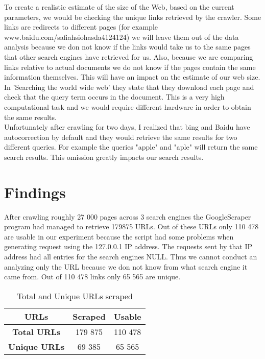 \documentclass{sig-alternate}
\begin{document}
To create a realistic estimate of the size of the Web, based on the current parameters, we would be checking the unique links retrieved by the crawler. Some links are redirects to different pages (for example www.baidu.com/safiahsiohasda4124124) we will leave them out of the data analysis because we don not know if the links would take us to the same pages that other search engines have retrieved for us. Also, because we are comparing links relative to actual documents we do not know if the pages contain the same information themselves. This will have an impact on the estimate of our web size. In 'Searching the world wide web' they state that they download each page and check that the query term occurs in the document. This is a very high computational task and we would require different hardware in order to obtain the same results.\\

Unfortunately after crawling for two days, I realized that bing and Baidu have autocorrection by default and they would retrieve the same results for two different queries. For example the queries "apple" and "aple" will return the same search results. This omission greatly impacts our search results.\\

\section{Findings}

After crawling roughly 27 000 pages across 3 search engines the GoogleScraper program had managed to retrieve 179875 URLs. Out of these URLs only 110 478 are usable in our experiment because the script had some problems when generating request using the 127.0.0.1 IP address. The requests sent by that IP address had all entries for the search engines NULL. Thus we cannot conduct an analyzing only the URL because we don not know from what search engine it came from. Out of 110 478 links only 65 565 are unique.\\

\begin{table}[h]
\centering
\begin{tabular}{|c|c|c|}
\hline
\rowcolor[HTML]{000000} 
{\color[HTML]{FFFFFF} URLs} & {\color[HTML]{FFFFFF} Scraped} & {\color[HTML]{FFFFFF} Usable} \\ \hline
\textbf{Total URLs}         & 179 875                        & 110 478                       \\ \hline
\textbf{Unique URLs}        & 69 385                         & 65 565                        \\ \hline
\end{tabular}
\caption{Total and Unique URLs scraped}
\end{table}
\end{document}

